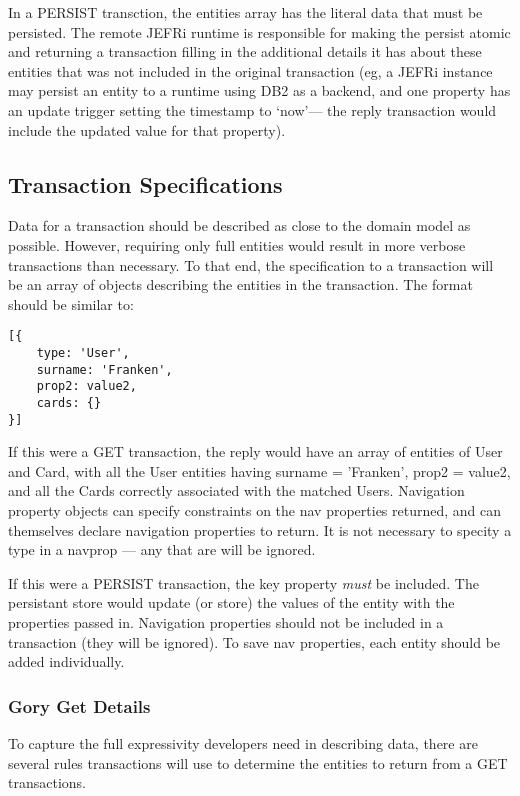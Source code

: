 \documentclass{article}
\begin{document}
In a PERSIST transction, the entities array has the literal data that must be
persisted. The remote JEFRi runtime is responsible for making the persist atomic
and returning a transaction filling in the additional details it has about these
entities that was not included in the original transaction (eg, a JEFRi
instance may persist an entity to a runtime using DB2 as a backend, and one
property has an update trigger setting the timestamp to `now'--- the reply
transaction would include the updated value for that property).

\subsection{Transaction Specifications}
Data for a transaction should be described as close to the domain model as
possible. However, requiring only full entities would result in more verbose
transactions than necessary. To that end, the specification to a transaction
will be an array of objects describing the entities in the transaction. The
format should be similar to:

\linespread{1}
\begin{lstlisting}
[{
	type: 'User',
	surname: 'Franken',
	prop2: value2,
	cards: {}
}]
\end{lstlisting}

\linespread{1.6}
If this were a GET transaction, the reply would have an array of entities of
User and Card, with all the User entities having surname = 'Franken', prop2 =
value2, and all the Cards correctly associated with the matched Users.
Navigation property objects can specify constraints on the nav properties
returned, and can themselves declare navigation properties to return. It is not
necessary to specity a type in a navprop --- any that are will be ignored.

If this were a PERSIST transaction, the key property {\it must } be included.
The persistant store would update (or store) the values of the entity with the
properties passed in. Navigation properties should not be included in a
transaction (they will be ignored). To save nav properties, each entity should
be added individually.

\subsubsection{Gory Get Details}
To capture the full expressivity developers need in describing data, there are
several rules transactions will use to determine the entities to return from a
GET transactions.
\end{document}

